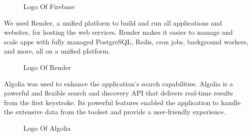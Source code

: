 \vspace{2cm}

\begin{figure}[H]
    \centering
    \caption{  Logo Of Firebase }
    \label{fig: Firebase_Logo}
\end{figure}

We used {\color{purple}Render}, a unified platform to build and run all applications and websites, for hosting the web services. Render makes it easier to manage and scale apps with fully managed PostgreSQL, Redis, cron jobs, background workers, and more, all on a unified platform.

\begin{figure}[H]
    \centering
    \caption{  Logo Of Render }
    \label{fig: Render_Logo}
\end{figure}


\newpage
{\color{purple}Algolia} was used to enhance the application's search capabilities. Algolia is a powerful and flexible search and discovery API that delivers real-time results from the first keystroke. Its powerful features enabled the application to handle the extensive data from the  toolset and provide a user-friendly experience.

\begin{figure}[H]
    \centering
    \caption{  Logo Of Algolia }
    \label{fig: Algolia_Logo}
\end{figure}


